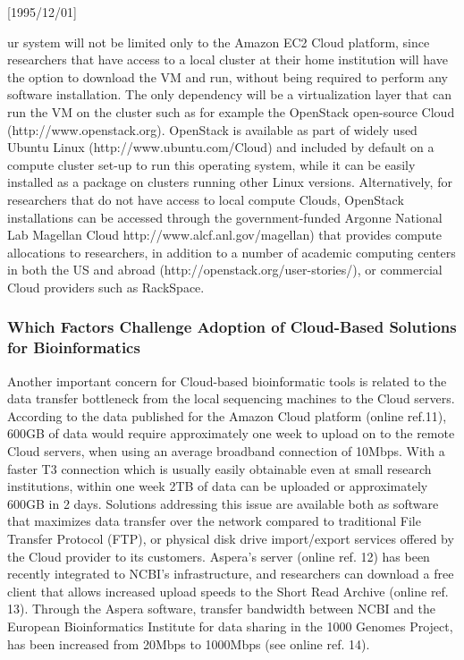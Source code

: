 \NeedsTeXFormat{LaTeX2e}[1995/12/01] \documentclass[10pt]{bmc_article}
\newenvironment{bmcformat}{\begin{raggedright}\baselineskip20pt\sloppy\setboolean{publ}{false}}{\end{raggedright}\baselineskip20pt\sloppy}
\begin{document}
\begin{bmcformat}
ur system will not be limited only to the Amazon EC2 Cloud platform, since researchers that have access to a
local cluster at their home institution will have the option to download the VM and run, without being
required to perform any software installation.  The only dependency will be a virtualization layer that can
run the VM on the cluster such as for example the OpenStack open-source Cloud (http://www.openstack.org).
OpenStack is available as part of widely used Ubuntu Linux (http://www.ubuntu.com/Cloud) and included by
default on a compute cluster set-up to run this operating system, while it can be easily installed as a
package on clusters running other Linux versions. Alternatively, for researchers that do not have access to
local compute Clouds, OpenStack installations can be accessed through the government-funded Argonne National
Lab Magellan Cloud http://www.alcf.anl.gov/magellan) that provides compute allocations to researchers, in
addition to a number of academic computing centers in both the US and abroad
(http://openstack.org/user-stories/), or commercial Cloud providers such as RackSpace.


\subsubsection*{Which Factors Challenge Adoption of Cloud-Based Solutions for Bioinformatics }

Another important concern for Cloud-based bioinformatic tools is related to the data transfer bottleneck from
the local sequencing machines to the Cloud servers.  According to the data published for the Amazon Cloud
platform (online ref.11), 600GB of data would require approximately one week to upload on to the remote Cloud
servers, when using an average broadband connection of 10Mbps. With a faster T3 connection which is usually
easily obtainable even at small research institutions, within one week 2TB of data can be uploaded or
approximately 600GB in 2 days.  Solutions addressing this issue are available both as software that maximizes
data transfer over the network compared to traditional File Transfer Protocol (FTP), or physical disk drive
import/export services offered by the Cloud provider to its customers. Aspera's server (online ref. 12) has
been recently integrated to NCBI's infrastructure, and researchers can download a free client that allows
increased upload speeds to the Short Read Archive (online ref. 13).  Through the Aspera software, transfer
bandwidth between NCBI and the European Bioinformatics Institute for data sharing in the 1000 Genomes Project,
has been increased from 20Mbps to 1000Mbps (see online ref. 14). 


\end{bmcformat}
\end{document}
